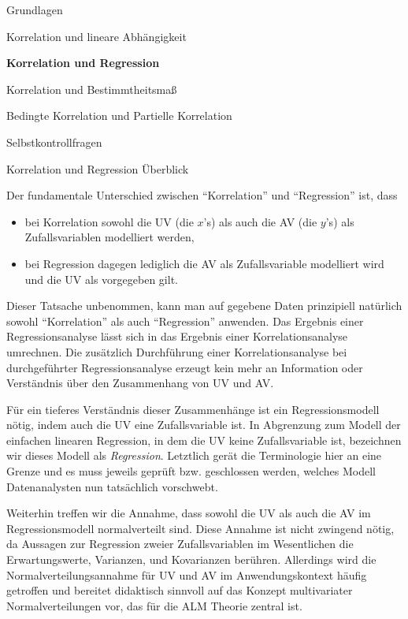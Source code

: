 \documentclass[
  8pt,
  ignorenonframetext,
]{beamer}
\providecommand{\tightlist}{%
  \setlength{\itemsep}{0pt}\setlength{\parskip}{0pt}}
\begin{document}
\begin{frame}{}
\protect\hypertarget{section-6}{}
\vfill
\large

Grundlagen

Korrelation und lineare Abhängigkeit

\textbf{Korrelation und Regression}

Korrelation und Bestimmtheitsmaß

Bedingte Korrelation und Partielle Korrelation

Selbstkontrollfragen

\vfill
\end{frame}

\begin{frame}{Korrelation und Regression}
\protect\hypertarget{korrelation-und-regression}{}
Überblick

\footnotesize

Der fundamentale Unterschied zwischen ``Korrelation'' und ``Regression''
ist, dass

\begin{itemize}
\tightlist
\item
  bei Korrelation sowohl die UV (die \(x\)'s) als auch die AV (die
  \(y\)'s) als Zufallsvariablen modelliert werden,
\item
  bei Regression dagegen lediglich die AV als Zufallsvariable modelliert
  wird und die UV als vorgegeben gilt.
\end{itemize}

Dieser Tatsache unbenommen, kann man auf gegebene Daten prinzipiell
natürlich sowohl ``Korrelation'' als auch ``Regression'' anwenden. Das
Ergebnis einer Regressionsanalyse lässt sich in das Ergebnis einer
Korrelationsanalyse umrechnen. Die zusätzlich Durchführung einer
Korrelationsanalyse bei durchgeführter Regressionsanalyse erzeugt kein
mehr an Information oder Verständnis über den Zusammenhang von UV und
AV.

Für ein tieferes Verständnis dieser Zusammenhänge ist ein
Regressionsmodell nötig, indem auch die UV eine Zufallsvariable ist. In
Abgrenzung zum Modell der einfachen linearen Regression, in dem die UV
keine Zufallsvariable ist, bezeichnen wir dieses Modell als
\textit{Regression}. Letztlich gerät die Terminologie hier an eine
Grenze und es muss jeweils geprüft bzw. geschlossen werden, welches
Modell Datenanalysten nun tatsächlich vorschwebt.

Weiterhin treffen wir die Annahme, dass sowohl die UV als auch die AV im
Regressionsmodell normalverteilt sind. Diese Annahme ist nicht zwingend
nötig, da Aussagen zur Regression zweier Zufallsvariablen im
Wesentlichen die Erwartungswerte, Varianzen, und Kovarianzen berühren.
Allerdings wird die Normalverteilungsannahme für UV und AV im
Anwendungskontext häufig getroffen und bereitet didaktisch sinnvoll auf
das Konzept multivariater Normalverteilungen vor, das für die ALM
Theorie zentral ist.
\end{frame}
\end{document}
